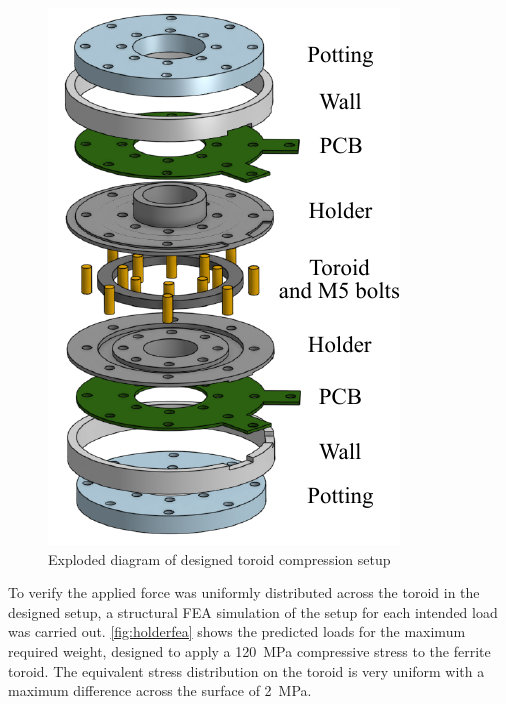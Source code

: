 \documentclass[conference]{IEEEtran}
\begin{document}
\begin{figure}
  \centering
  \includegraphics{figures/compressionholder.pdf}
  \caption{Exploded diagram of designed toroid compression setup}
  \label{fig:compressionholder}
\end{figure}

To verify the applied force was uniformly distributed across the toroid in the designed setup, a structural FEA simulation of the setup for each intended load was carried out. 
\cref{fig:holderfea} shows the predicted loads for the maximum required weight, designed to apply a \SI{120}{\mega\pascal} compressive stress to the ferrite toroid.
The equivalent stress distribution on the toroid is very uniform with a maximum difference across the surface of \SI{2}{\mega\pascal}. 
\end{document}
